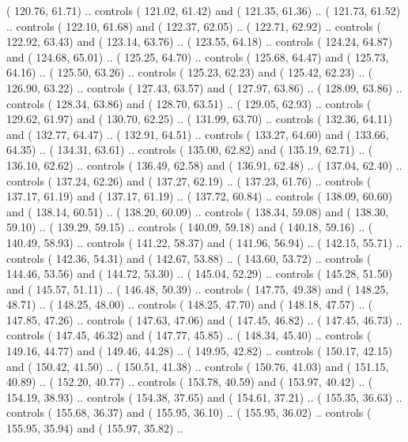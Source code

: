 {        ( 120.76,  61.71) .. controls ( 121.02,  61.42) and ( 121.35,  61.36) ..
        ( 121.73,  61.52) .. controls ( 122.10,  61.68) and ( 122.37,  62.05) ..
        ( 122.71,  62.92) .. controls ( 122.92,  63.43) and ( 123.14,  63.76) ..
        ( 123.55,  64.18) .. controls ( 124.24,  64.87) and ( 124.68,  65.01) ..
        ( 125.25,  64.70) .. controls ( 125.68,  64.47) and ( 125.73,  64.16) ..
        ( 125.50,  63.26) .. controls ( 125.23,  62.23) and ( 125.42,  62.23) ..
        ( 126.90,  63.22) .. controls ( 127.43,  63.57) and ( 127.97,  63.86) ..
        ( 128.09,  63.86) .. controls ( 128.34,  63.86) and ( 128.70,  63.51) ..
        ( 129.05,  62.93) .. controls ( 129.62,  61.97) and ( 130.70,  62.25) ..
        ( 131.99,  63.70) .. controls ( 132.36,  64.11) and ( 132.77,  64.47) ..
        ( 132.91,  64.51) .. controls ( 133.27,  64.60) and ( 133.66,  64.35) ..
        ( 134.31,  63.61) .. controls ( 135.00,  62.82) and ( 135.19,  62.71) ..
        ( 136.10,  62.62) .. controls ( 136.49,  62.58) and ( 136.91,  62.48) ..
        ( 137.04,  62.40) .. controls ( 137.24,  62.26) and ( 137.27,  62.19) ..
        ( 137.23,  61.76) .. controls ( 137.17,  61.19) and ( 137.17,  61.19) ..
        ( 137.72,  60.84) .. controls ( 138.09,  60.60) and ( 138.14,  60.51) ..
        ( 138.20,  60.09) .. controls ( 138.34,  59.08) and ( 138.30,  59.10) ..
        ( 139.29,  59.15) .. controls ( 140.09,  59.18) and ( 140.18,  59.16) ..
        ( 140.49,  58.93) .. controls ( 141.22,  58.37) and ( 141.96,  56.94) ..
        ( 142.15,  55.71) .. controls ( 142.36,  54.31) and ( 142.67,  53.88) ..
        ( 143.60,  53.72) .. controls ( 144.46,  53.56) and ( 144.72,  53.30) ..
        ( 145.04,  52.29) .. controls ( 145.28,  51.50) and ( 145.57,  51.11) ..
        ( 146.48,  50.39) .. controls ( 147.75,  49.38) and ( 148.25,  48.71) ..
        ( 148.25,  48.00) .. controls ( 148.25,  47.70) and ( 148.18,  47.57) ..
        ( 147.85,  47.26) .. controls ( 147.63,  47.06) and ( 147.45,  46.82) ..
        ( 147.45,  46.73) .. controls ( 147.45,  46.32) and ( 147.77,  45.85) ..
        ( 148.34,  45.40) .. controls ( 149.16,  44.77) and ( 149.46,  44.28) ..
        ( 149.95,  42.82) .. controls ( 150.17,  42.15) and ( 150.42,  41.50) ..
        ( 150.51,  41.38) .. controls ( 150.76,  41.03) and ( 151.15,  40.89) ..
        ( 152.20,  40.77) .. controls ( 153.78,  40.59) and ( 153.97,  40.42) ..
        ( 154.19,  38.93) .. controls ( 154.38,  37.65) and ( 154.61,  37.21) ..
        ( 155.35,  36.63) .. controls ( 155.68,  36.37) and ( 155.95,  36.10) ..
        ( 155.95,  36.02) .. controls ( 155.95,  35.94) and ( 155.97,  35.82) ..
}
